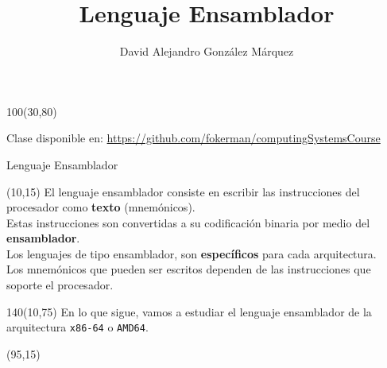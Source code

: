 \documentclass[aspectratio=169]{beamer}
\title{\Huge Lenguaje Ensamblador}
\author{David Alejandro González Márquez}
\date{}
\begin{document}
\begin{frame}[plain]
    \titlepage
    \begin{textblock}{100}(30,80)
    \begin{tcolorbox}[size=small,width=\textwidth,colback={gray!30},title={}]
    \begin{center}
     \scriptsize Clase disponible en: \url{https://github.com/fokerman/computingSystemsCourse}
    \end{center}
    \end{tcolorbox}
    \end{textblock}
\end{frame}

\begin{frame}[fragile]{Lenguaje Ensamblador}
    \begin{textblock}{80}(10,15)
    El lenguaje ensamblador consiste en escribir las instrucciones del procesador como \textbf{texto} (mnemónicos).\\
    \bigskip
    Estas instrucciones son convertidas a su codificación binaria por medio del \textbf{ensamblador}.\\
    \bigskip
    Los lenguajes de tipo ensamblador, son \textbf{específicos} para cada arquitectura.\\
    \bigskip
    Los mnemónicos que pueden ser escritos dependen de las instrucciones que soporte el procesador.
    \end{textblock}
    \begin{textblock}{140}(10,75)
    \textcolor{verdeuca}{En lo que sigue, vamos a estudiar el lenguaje ensamblador de la arquitectura \texttt{x86-64} o \texttt{AMD64}.}
    \end{textblock}
    \begin{textblock}{70}(95,15)  \end{textblock}
\end{frame}
\end{document}

